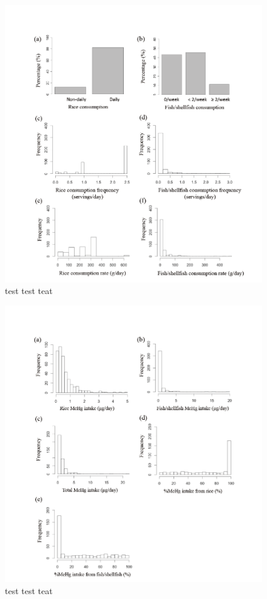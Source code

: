 \begin{figure}
  \centering
    \label{fig:Fig26}
  \includegraphics[scale=1]{Figures/Fig26.pdf}
  \caption[test caption]{test test teat}
\end{figure}

\begin{figure}
  \centering
    \label{fig:Fig27}
  \includegraphics[scale=1]{Figures/Fig27.pdf}
  \caption[test caption]{test test teat}
\end{figure}

